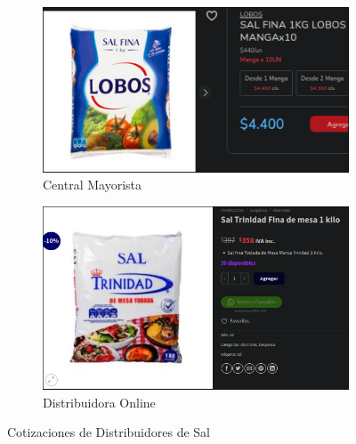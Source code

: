 \documentclass[12pt]{article}
\begin{document}
        \begin{figure}[H] %
            \centering
            \begin{subfigure}{0.4\textwidth}
                \centering
                \includegraphics[width=0.9\linewidth]{lobos} %
                \caption{Central Mayorista}
                \label{fig:central_mayorista_sal}
            \end{subfigure}
            \hfill
            \begin{subfigure}{0.35\textwidth}
                \centering
                \includegraphics[width=0.9\linewidth]{online} %
                \caption{Distribuidora Online}
                \label{fig:distribuidora_online_sal}
            \end{subfigure}
            \caption{Cotizaciones de Distribuidores de Sal}
            \label{fig:cotizaciones_sal}
        \end{figure} %
\end{document}
